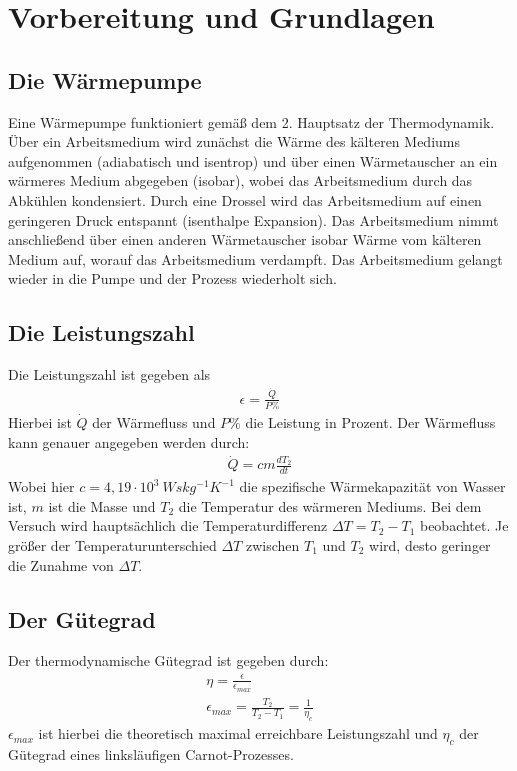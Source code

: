\documentclass{article}
\begin{document}
\newpage
\section{Vorbereitung und Grundlagen}
\subsection{Die Wärmepumpe}
Eine Wärmepumpe funktioniert gemäß dem 2. Hauptsatz der Thermodynamik. Über ein Arbeitsmedium wird zunächst die Wärme des kälteren Mediums aufgenommen (adiabatisch und isentrop) und über einen Wärmetauscher an ein wärmeres Medium abgegeben (isobar), wobei das Arbeitsmedium durch das Abkühlen kondensiert. Durch eine Drossel wird das Arbeitsmedium auf einen geringeren Druck entspannt (isenthalpe Expansion). Das Arbeitsmedium nimmt anschließend über einen anderen Wärmetauscher isobar Wärme vom kälteren Medium auf, worauf das Arbeitsmedium verdampft. Das Arbeitsmedium gelangt wieder in die Pumpe und der Prozess wiederholt sich.
\subsection{Die Leistungszahl}
Die Leistungszahl ist gegeben als
\begin{align} \label{eq:1}
    \epsilon = \frac{\dot{Q}}{P\%}
\end{align}
Hierbei ist $\dot{Q}$ der Wärmefluss und $P\%$ die Leistung in Prozent.
Der Wärmefluss kann genauer angegeben werden durch:
\begin{align} \label{eq:2}
    \dot{Q} = cm\frac{dT_2}{dt}
\end{align}
Wobei hier $c=4,19\cdot 10^{3} \ Wskg^{-1}K^{-1}$ die spezifische Wärmekapazität von Wasser ist, $m$ ist die Masse und $T_2$ die Temperatur des wärmeren Mediums.
Bei dem Versuch wird hauptsächlich die Temperaturdifferenz $\Delta T = T_2-T_1$ beobachtet. Je größer der Temperaturunterschied $\Delta T$ zwischen $T_1$ und $T_2$ wird, desto geringer die Zunahme von $\Delta T$.
\subsection{Der Gütegrad}
Der thermodynamische Gütegrad ist gegeben durch:
\begin{align} \label{eq:3}
    \eta = \frac{\epsilon }{\epsilon_{max}} \\
    \epsilon_{max} = \frac{T_2}{T_2-T_1} = \frac{1}{\eta_c}
\end{align}
$\epsilon_{max}$ ist hierbei die theoretisch maximal erreichbare Leistungszahl und $\eta_c$ der Gütegrad eines linksläufigen Carnot-Prozesses.\cite{pumpenscript}
\newpage
\end{document}
